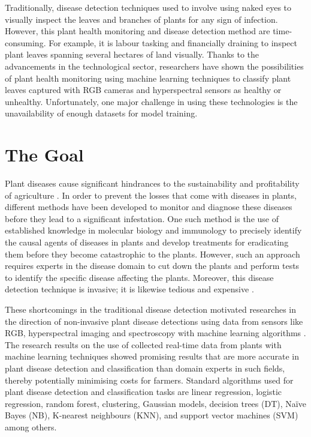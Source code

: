 Traditionally, disease detection techniques used to involve using naked eyes to visually inspect the leaves and branches of plants for any sign of infection. However, this plant health monitoring and disease detection method are time-consuming. For example, it is labour tasking and financially draining to inspect plant leaves spanning several hectares of land visually. Thanks to the advancements in the technological sector, researchers have shown the possibilities of plant health monitoring using machine learning techniques to classify plant leaves captured with RGB cameras and hyperspectral sensors as healthy or unhealthy. Unfortunately, one major challenge in using these technologies is the unavailability of enough datasets for model training.


\section{The Goal}
Plant diseases cause significant hindrances to the sustainability and profitability of agriculture \cite{harvey2014extreme}. In order to prevent the losses that come with diseases in plants, different methods have been developed to monitor and diagnose these diseases before they lead to a significant infestation. One such method is the use of established knowledge in molecular biology and immunology to precisely identify the causal agents of diseases in plants and develop treatments for eradicating them before they become catastrophic to the plants. However, such an approach requires experts in the disease domain to cut down the plants and perform tests to identify the specific disease affecting the plants. Moreover, this disease detection technique is invasive; it is likewise tedious and expensive \cite{wang2017automatic}.

These shortcomings in the traditional disease detection motivated researches in the direction of non-invasive plant disease detections using data from sensors like RGB, hyperspectral imaging and spectroscopy with machine learning algorithms \cite{mohanty2016using, ashourloo2016investigation, zhang2019deep}. The research results on the use of collected real-time data from plants with machine learning techniques showed promising results that are more accurate in plant disease detection and classification than domain experts in such fields, thereby potentially minimising costs for farmers. %
Standard algorithms used for plant disease detection and classification tasks are linear regression, logistic regression, random forest, clustering, Gaussian models, decision trees (DT), Naïve Bayes (NB), K-nearest neighbours (KNN), and support vector machines (SVM) among others.


